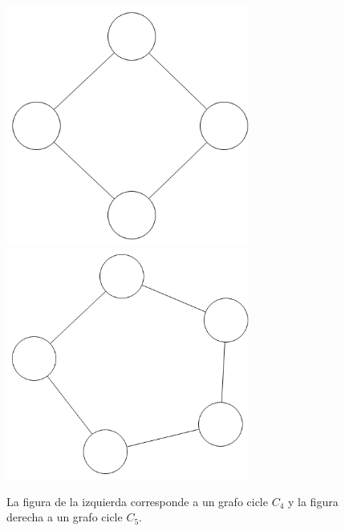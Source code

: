 \begin{figure}[H]
\includegraphics[width=80mm]{C_4.png}
\includegraphics[width=80mm]{C_5.png}
\caption{La figura de la izquierda corresponde a un grafo cicle $C_4$ y la figura derecha a un grafo cicle $C_5$.}
\label{overflow}
\end{figure}